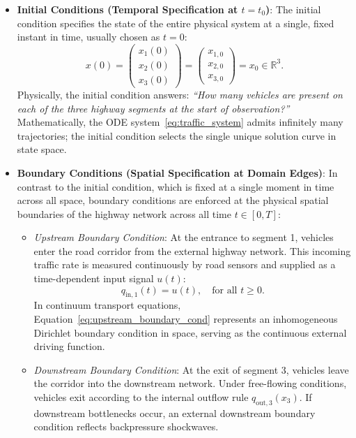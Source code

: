 \documentclass[runningheads]{llncs}
\begin{document}
\begin{itemize}
    \item \textbf{Initial Conditions (Temporal Specification at $t = t_0$)}:
    The initial condition specifies the state of the entire physical system at a single, fixed instant in time, usually chosen as $t = 0$:
    \begin{equation}
    \label{eq:initial_cond_vector}
    x(0) = \begin{pmatrix} x_1(0) \\ x_2(0) \\ x_3(0) \end{pmatrix} = \begin{pmatrix} x_{1,0} \\ x_{2,0} \\ x_{3,0} \end{pmatrix} = x_0 \in \mathbb{R}^3.
    \end{equation}
    Physically, the initial condition answers: \emph{``How many vehicles are present on each of the three highway segments at the start of observation?''} Mathematically, the ODE system~\eqref{eq:traffic_system} admits infinitely many trajectories; the initial condition selects the single unique solution curve in state space.
    
    \item \textbf{Boundary Conditions (Spatial Specification at Domain Edges)}:
    In contrast to the initial condition, which is fixed at a single moment in time across all space, boundary conditions are enforced at the physical spatial boundaries of the highway network across all time $t \in [0, T]$:
    \begin{itemize}
        \item \emph{Upstream Boundary Condition}: At the entrance to segment 1, vehicles enter the road corridor from the external highway network. This incoming traffic rate is measured continuously by road sensors and supplied as a time-dependent input signal $u(t)$:
        \begin{equation}
        \label{eq:upstream_boundary_cond}
        q_{\text{in}, 1}(t) = u(t), \quad \text{for all } t \ge 0.
        \end{equation}
        In continuum transport equations, Equation~\eqref{eq:upstream_boundary_cond} represents an inhomogeneous Dirichlet boundary condition in space, serving as the continuous external driving function.
        \item \emph{Downstream Boundary Condition}: At the exit of segment 3, vehicles leave the corridor into the downstream network. Under free-flowing conditions, vehicles exit according to the internal outflow rule $q_{\text{out}, 3}(x_3)$. If downstream bottlenecks occur, an external downstream boundary condition reflects backpressure shockwaves.
    \end{itemize}
\end{itemize}
\end{document}
